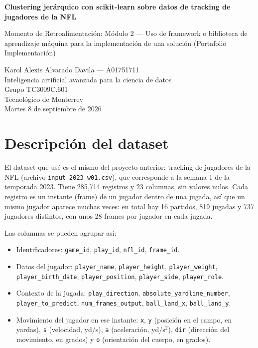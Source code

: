 \documentclass[11pt,a4paper]{article}
\begin{document}
\begin{center}
  {\LARGE\bfseries Clustering jerárquico con scikit-learn sobre datos de tracking de jugadores de la NFL\par}
  \vspace{0.8em}
  {\large Momento de Retroalimentación: Módulo 2 --- Uso de framework o biblioteca de aprendizaje máquina para la implementación de una solución (Portafolio Implementación)\par}
  \vspace{1.2em}
  Karol Alexis Alvarado Davila --- A01751711\\[0.3em]
  Inteligencia artificial avanzada para la ciencia de datos\\[0.3em]
  Grupo TC3009C.601\\[0.3em]
  Tecnológico de Monterrey\\[0.3em]
  Martes 8 de septiembre de 2026
\end{center}

\vspace{1em}

\section{Descripción del dataset}

El dataset que usé es el mismo del proyecto anterior: tracking de jugadores de la NFL (archivo \texttt{input\_2023\_w01.csv}), que corresponde a la semana 1 de la temporada 2023. Tiene 285{,}714 registros y 23 columnas, sin valores nulos. Cada registro es un instante (frame) de un jugador dentro de una jugada, así que un mismo jugador aparece muchas veces: en total hay 16 partidos, 819 jugadas y 737 jugadores distintos, con unos 28 frames por jugador en cada jugada.

Las columnas se pueden agrupar así:

\begin{itemize}
  \item Identificadores: \texttt{game\_id}, \texttt{play\_id}, \texttt{nfl\_id}, \texttt{frame\_id}.
  \item Datos del jugador: \texttt{player\_name}, \texttt{player\_height}, \texttt{player\_weight}, \texttt{player\_birth\_date}, \texttt{player\_position}, \texttt{player\_side}, \texttt{player\_role}.
  \item Contexto de la jugada: \texttt{play\_direction}, \texttt{absolute\_yardline\_number}, \texttt{player\_to\_predict}, \texttt{num\_frames\_output}, \texttt{ball\_land\_x}, \texttt{ball\_land\_y}.
  \item Movimiento del jugador en ese instante: \texttt{x}, \texttt{y} (posición en el campo, en yardas), \texttt{s} (velocidad, yd/s), \texttt{a} (aceleración, yd/s$^2$), \texttt{dir} (dirección del movimiento, en grados) y \texttt{o} (orientación del cuerpo, en grados).
\end{itemize}
\end{document}
